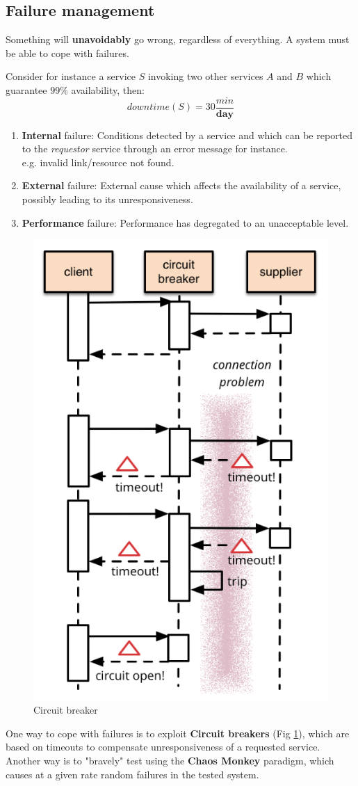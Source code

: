 \subsection{Failure management}

\begin{paracol}{2}
   \vspace{\fill}
   
   Something will \textbf{unavoidably} go wrong,
   regardless of everything.
   A system must be able to cope with failures.
   \nl

   Consider for instance a service $S$ invoking two other services $A$ and $B$ which guarantee $99\%$ availability, then:
   \[
      downtime(S) = 30\frac{min}{\textbf{day}}
   \]


   \vspace{\fill}

   \switchcolumn

   \begin{enumerate}
      \item \textbf{Internal} failure:
      Conditions detected by a service and which can be reported to the \textit{requestor} service through an error message for instance.\\
      e.g. invalid link/resource not found.  
      \item \textbf{External} failure:
      External cause which affects the availability of a service,
      possibly leading to its unresponsiveness.
      \item \textbf{Performance} failure:
      Performance has degregated to an unacceptable level.
   \end{enumerate}
\end{paracol}

\begin{figure}[htbp]
   \centering
   \includegraphics[width=0.2\columnwidth]{images/circuit_breaker.png}
   \caption{Circuit breaker}
   \label{fig:circuit_breaker}
\end{figure}
One way to cope with failures is to exploit \textbf{Circuit breakers} (Fig \ref{fig:circuit_breaker}),
which are based on timeouts to compensate unresponsiveness of a requested service.\\
Another way is to "bravely" test using the \textbf{Chaos Monkey} paradigm,
which causes at a given rate random failures in the tested system.

